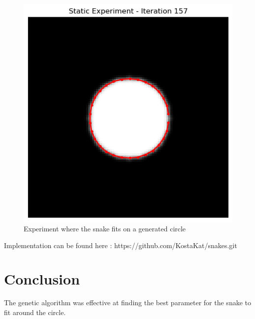 \documentclass[10pt,twocolumn,letterpaper]{article}
\begin{document}
\begin{figure}[h!]
    \centering
    \includegraphics[width=1\linewidth]{47b4a0ee-e0b5-40a0-a248-65a246abff6a.png}
    \caption{Experiment where the snake fits on a generated circle}
    \label{fig:enter-label}
\end{figure}

Implementation can be found here : https://github.com/KostaKat/snakes.git


\section{Conclusion}
The genetic algorithm was effective at finding the best parameter for the snake to fit around the circle.

{\small


}
\end{document}
